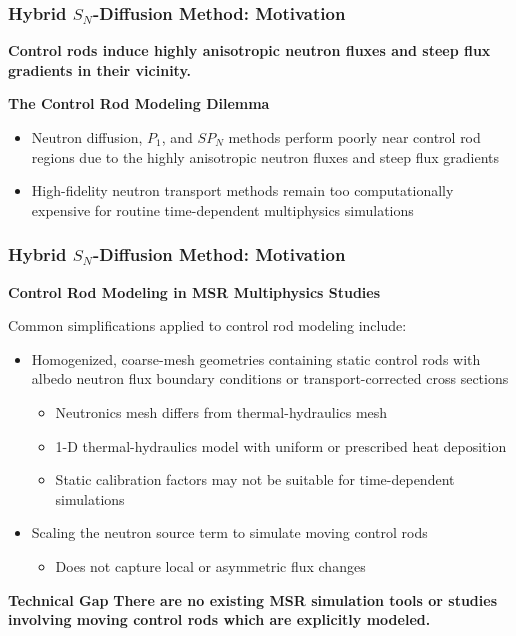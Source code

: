\begin{frame}
  \frametitle{Hybrid $S_N$-Diffusion Method: Motivation}
  \textbf{Control rods induce highly anisotropic neutron fluxes and steep flux gradients in their
  vicinity.}
  \begin{block}{\textbf{The Control Rod Modeling Dilemma}}
    \begin{itemize}
      \item Neutron diffusion, $P_1$, and $SP_N$ methods perform poorly near control rod regions
        due to the highly anisotropic neutron fluxes and steep flux gradients
      \item High-fidelity neutron transport methods remain too computationally expensive for
        routine time-dependent multiphysics simulations
    \end{itemize}
  \end{block}
\end{frame}

\begin{frame}
  \frametitle{Hybrid $S_N$-Diffusion Method: Motivation}
  \textbf{Control Rod Modeling in MSR Multiphysics Studies}
  \vspace{.2cm}

  Common simplifications applied to control rod modeling include:
  \begin{itemize}
    \item Homogenized, coarse-mesh geometries containing static control rods with albedo neutron
      flux boundary conditions \cite{kophazi_development_2009} or transport-corrected cross
      sections \cite{cui_development_2021, jaradat_development_2021, yang_development_2022}
      \begin{itemize}
        \item Neutronics mesh differs from thermal-hydraulics mesh
        \item 1-D thermal-hydraulics model with uniform or prescribed heat deposition
        \item Static calibration factors may not be suitable for time-dependent simulations
      \end{itemize}
    \item Scaling the neutron source term to simulate moving control rods
      \cite{delpech_benchmark_2003, krepel_dyn3d-msr_2007, jaradat_development_2021,
      yang_development_2022}
      \begin{itemize}
        \item Does not capture local or asymmetric flux changes
      \end{itemize}
  \end{itemize}

  \begin{block}{\textbf{Technical Gap}}
    \textbf{There are no existing MSR simulation tools or studies involving moving control rods
    which are explicitly modeled.}
  \end{block}
\end{frame}
